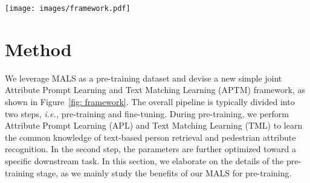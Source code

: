 \documentclass[sigconf]{acmart}
\def\ie{\emph{i.e.}}
\begin{document}
\begin{figure*}[t]
\vspace{-.1in}
\begin{center}
     \texttt{[image: images/framework.pdf]}
\end{center}
\vspace{-.2in}
      \caption{Overview of the proposed Attribute Prompt Learning and Text Matching Learning (APTM) framework for pre-training on MALS. APTM framework contains one image-attribute stream and one image-text stream with weight-shared encoders. In particular, the framework comprises three encoders, \ie, Image Encoder ($E_I$), Text Encoder ($E_T$), Cross Encoder ($E_C$), and two MLPs-based headers.  The Image Encoder and Text Encoder are to produce the embeddings of the image and text, respectively, while the cross encoder seeks to fuse the image and text embeddings for the subsequent predictions.}\label{fig: framework}
      \vspace{-.1in}
\end{figure*}


\section{Method} \label{method}
We leverage MALS as a pre-training dataset and devise a new simple joint Attribute Prompt Learning and Text Matching Learning (APTM) framework, as shown in Figure~\ref{fig: framework}. The overall pipeline is typically divided into two steps, \emph{i.e.,} pre-training and fine-tuning.  
During pre-training, we perform Attribute Prompt Learning (APL) and Text Matching Learning (TML) to learn the common knowledge of text-based person retrieval and pedestrian attribute recognition. In the second step, the parameters are further optimized toward a specific downstream task.
In this section, we elaborate on the details of the pre-training stage, as we mainly study the benefits of our MALS for pre-training. 
\end{document}
